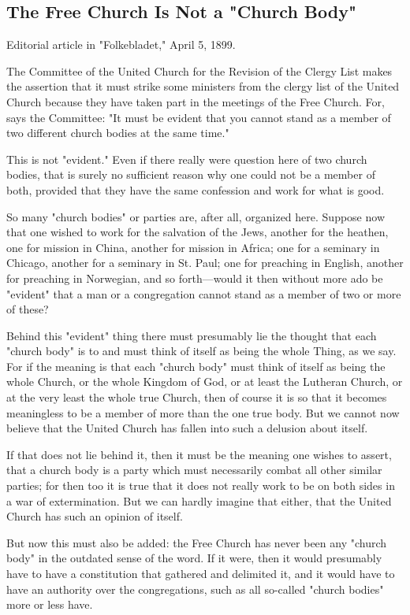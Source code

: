 
\subsection{The Free Church Is Not a "Church Body"}

Editorial article in "Folkebladet," April 5, 1899.

The Committee of the United Church for the Revision of the Clergy List makes the assertion that it must strike some ministers from the clergy list of the United Church because they have taken part in the meetings of the Free Church. For, says the Committee: "It must be evident that you cannot stand as a member of two different church bodies at the same time."

This is not "evident." Even if there really were question here of two church bodies, that is surely no sufficient reason why one could not be a member of both, provided that they have the same confession and work for what is good.

So many "church bodies" or parties are, after all, organized here. Suppose now that one wished to work for the salvation of the Jews, another for the heathen, one for mission in China, another for mission in Africa; one for a seminary in Chicago, another for a seminary in St. Paul; one for preaching in English, another for preaching in Norwegian, and so forth—would it then without more ado be "evident" that a man or a congregation cannot stand as a member of two or more of these?

Behind this "evident" thing there must presumably lie the thought that each "church body" is to and must think of itself as being the whole Thing, as we say. For if the meaning is that each "church body" must think of itself as being the whole Church, or the whole Kingdom of God, or at least the Lutheran Church, or at the very least the whole true Church, then of course it is so that it becomes meaningless to be a member of more than the one true body. But we cannot now believe that the United Church has fallen into such a delusion about itself.

If that does not lie behind it, then it must be the meaning one wishes to assert, that a church body is a party which must necessarily combat all other similar parties; for then too it is true that it does not really work to be on both sides in a war of extermination. But we can hardly imagine that either, that the United Church has such an opinion of itself.

But now this must also be added: the Free Church has never been any "church body" in the outdated sense of the word. If it were, then it would presumably have to have a constitution that gathered and delimited it, and it would have to have an authority over the congregations, such as all so-called "church bodies" more or less have.

